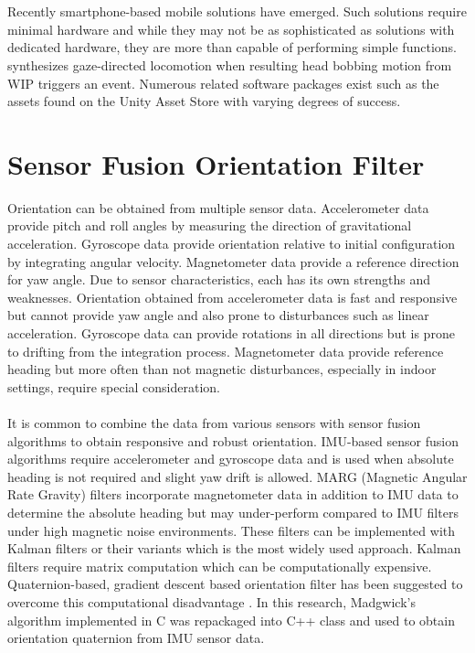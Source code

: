 \\\\
Recently smartphone-based mobile solutions have emerged. Such solutions require minimal hardware and while they may not be as sophisticated as solutions with dedicated hardware, they are more than capable of performing simple functions. \cite{Tre16} synthesizes gaze-directed locomotion when resulting head bobbing motion from WIP triggers an event. Numerous related software packages exist such as the assets found on the Unity Asset Store with varying degrees of success.

\newpage

\section{Sensor Fusion Orientation Filter}

Orientation can be obtained from multiple sensor data. Accelerometer data provide pitch and roll angles by measuring the direction of gravitational acceleration. Gyroscope data provide orientation relative to initial configuration by integrating angular velocity. Magnetometer data provide a reference direction for yaw angle. Due to sensor characteristics, each has its own strengths and weaknesses. Orientation obtained from accelerometer data is fast and responsive but cannot provide yaw angle and also prone to disturbances such as linear acceleration. Gyroscope data can provide rotations in all directions but is prone to drifting from the integration process. Magnetometer data provide reference heading but more often than not magnetic disturbances, especially in indoor settings, require special consideration.
\\\\
It is common to combine the data from various sensors with sensor fusion algorithms to obtain responsive and robust orientation. IMU-based sensor fusion algorithms require accelerometer and gyroscope data and is used when absolute heading is not required and slight yaw drift is allowed. MARG (Magnetic Angular Rate Gravity) filters incorporate magnetometer data in addition to IMU data to determine the absolute heading but may under-perform compared to IMU filters under high magnetic noise environments. These filters can be implemented with Kalman filters or their variants which is the most widely used approach. Kalman filters require matrix computation which can be computationally expensive. Quaternion-based, gradient descent based orientation filter has been suggested to overcome this computational disadvantage \citep{Mad11}. In this research, Madgwick's algorithm implemented in C was repackaged into C++ class and used to obtain orientation quaternion from IMU sensor data.
